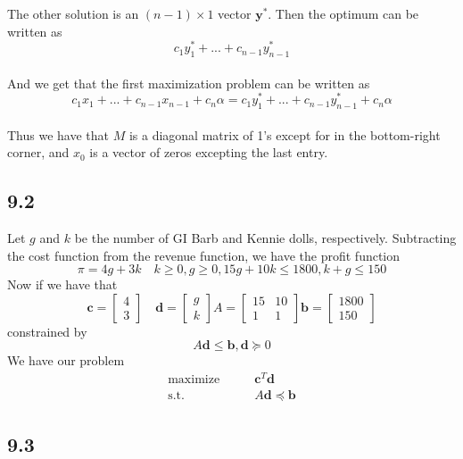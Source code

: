 \documentclass[letterpaper,12pt]{article}
\theoremstyle{definition}
\begin{document}
The other solution is an $(n-1) \times 1$ vector $\mathbf{y}^*$. Then the optimum can be written as\\
\[c_1y_1^* +...+ c_{n-1}y_{n-1}^*\]\\

And we get that the first maximization problem can be written as\\
\[c_1x_1 +...+ c_{n-1}x_{n-1} + c_n\alpha = c_1y_1^* +...+ c_{n-1}y_{n-1}^* + c_n\alpha\]\\

Thus we have that  $M$ is a diagonal matrix of 1's except for in the bottom-right corner, and $x_0$ is a vector of zeros excepting the last entry.

\subsection*{9.2}


Let $g$ and $k$ be the number of GI Barb and Kennie dolls, respectively. Subtracting the cost function from the revenue function, we have the profit function  \[\pi = 4g + 3k \quad k \geq 0, g \geq 0, 15g + 10k \leq 1800, k + g \leq 150\]
Now if we have that \[
\mathbf{c} = 
\begin{bmatrix}
4 \\ 3 
\end{bmatrix}
\quad \mathbf{d} = 
\begin{bmatrix}
   g \\ k 
\end{bmatrix}
A = 
\begin{bmatrix}
    15 & 10 \\ 1 & 1
\end{bmatrix}
\mathbf{b} = 
\begin{bmatrix}
    1800 \\ 150
\end{bmatrix}
\]
constrained by \[ A \mathbf{d} \leq \mathbf{b}, \mathbf{d} \succeq 0 \]
We have our problem
\begin{align*}
\underset{}{\text{maximize}} \qquad &\mathbf{c}^T \mathbf{d}\\
\text{s.t.} \qquad &A \mathbf{d} \preceq \mathbf{b}
\end{align*}




\subsection*{9.3}
\end{document}
